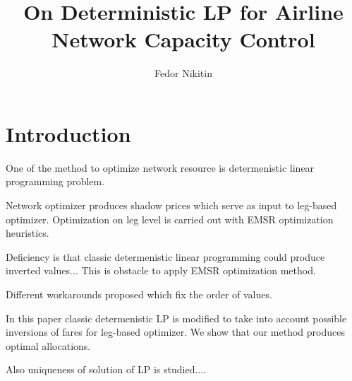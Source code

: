 \documentclass[a4paper,oneside]{article}
\title{On Deterministic LP for Airline Network Capacity Control}
\author{Fedor Nikitin}
\begin{document}
\maketitle

\section{Introduction}
One of the method to optimize network resource is determenistic
linear programming problem.

Network optimizer produces shadow prices which serve as input
to leg-based optimizer. Optimization on leg level is carried out
with EMSR optimization heuristics.

Deficiency is that classic determenistic linear programming
could produce inverted values... This is obstacle to apply
EMSR optimization method.

Different workarounds proposed which fix the order of values.

In this paper classic determenistic LP is modified to take
into account possible inversions of fares for leg-based optimizer.
We show that our method produces optimal allocations.

Also uniqueness of solution of LP is studied....
\end{document}
